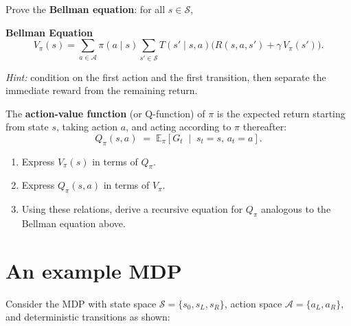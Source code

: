 \documentclass[11pt]{article}
\newcommand{\cS}{\mathcal{S}}
\newcommand{\cA}{\mathcal{A}}
\begin{document}
\begin{exercise}
\label{prob:bellman_proof} Prove the \textbf{Bellman equation}: for all $s \in \cS$,
\begin{callout}[note]
\textbf{Bellman Equation}
$$
V_\pi(s) = \sum_{a \in \cA} \pi(a \mid s) \sum_{s' \in \cS} T(s' \mid s, a)\bigl(R(s,a,s') + \gamma\, V_\pi(s')\bigr).
$$
\end{callout}
\textit{Hint:} condition on the first action and the first transition, then separate the immediate reward from the remaining return.
\end{exercise}


\begin{definition}\label{def:q_function}
The \textbf{action-value function} (or Q-function) of $\pi$ is the expected return starting from state $s$, taking action $a$, and acting according to $\pi$ thereafter:
$$
Q_\pi(s,a) \;=\; \mathbb{E}_\pi\!\left[G_t \;\middle|\; s_t = s,\, a_t = a\right].
$$
\end{definition}

\begin{exercise}
\label{prob:q_function}
\begin{enumerate}
\item\label{prob:Vpi_from_Qpi} Express $V_\pi(s)$ in terms of $Q_\pi$.
\item\label{prob:Qpi_from_Vpi} Express $Q_\pi(s,a)$ in terms of $V_\pi$.
\item\label{prob:bellman_Q} Using these relations, derive a recursive equation for $Q_\pi$ analogous to the Bellman equation above.
\end{enumerate}
\end{exercise}



\section{An example MDP}\label{prob:small_mdp}

Consider the MDP with state space $\cS = \{s_0, s_L, s_R\}$, action space $\cA = \{a_L, a_R\}$, and deterministic transitions as shown:

\begin{center}
\end{center}
\end{document}
